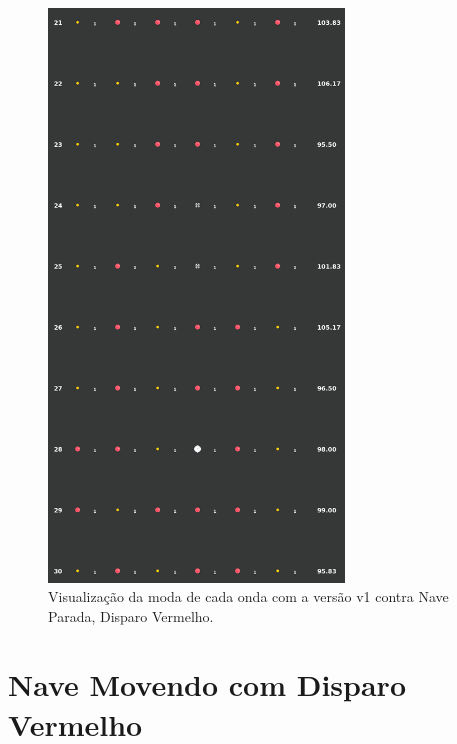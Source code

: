 \begin{figure}[H]
  \centering
  \includegraphics[width=0.7\textwidth]{figuras/ss/ss_redstill_ai_mode_1_3.png}
  \caption{Visualização da moda de cada onda com a versão v1 contra Nave Parada, Disparo Vermelho.}
  \label{fig:ss-moda-rs-1-3}
\end{figure}

\section{Nave Movendo com Disparo Vermelho}
\label{sec:apend-moda-ss-rm-v1}

